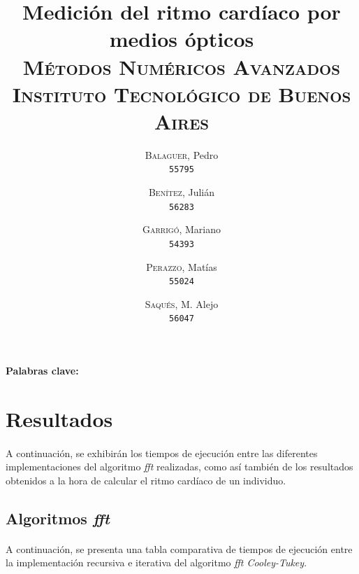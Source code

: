 \documentclass[12pt, twocolumn]{article}
\begin{document}
	\title{Medición del ritmo cardíaco por medios ópticos\\ 
		   \large{\textsc{Métodos Numéricos Avanzados}} \\
		   \normalsize{\textsc{Instituto Tecnológico de Buenos Aires}}}
	\author{
		\textsc{Balaguer}, Pedro \\
		\texttt{55795}
		\and
		\textsc{Benítez}, Julián \\
		\texttt{56283}
		\and
		\textsc{Garrigó}, Mariano \\
		\texttt{54393}
		\and
		\textsc{Perazzo}, Matías \\
		\texttt{55024}
		\and
		\textsc{Saqués}, M. Alejo \\
		\texttt{56047} 
	}
	\date{}
	\maketitle
	
	\begin{abstract}

	\end{abstract}
	
	\paragraph{Palabras clave:}
	
	\section{Resultados}
	
	\paragraph{} A continuación, se exhibirán los tiempos de ejecución entre las diferentes implementaciones del algoritmo \textit{fft} realizadas, como así también de los resultados obtenidos a la hora de calcular el ritmo cardíaco de un individuo.
	
	\subsection{Algoritmos \textit{fft}}
	
	\paragraph{} A continuación, se presenta una tabla comparativa de tiempos de ejecución entre la implementación recursiva e iterativa del algoritmo \textit{fft Cooley-Tukey}.
	
\end{document}
